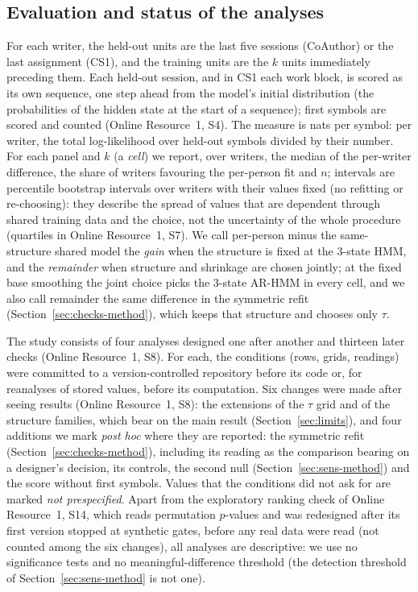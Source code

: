 \documentclass[pdflatex,sn-basic]{sn-jnl}
\newcommand{\Sref}[1]{Online Resource~1, S#1}
\newcommand{\hmmthree}{\mbox{3-state} HMM}
\newcommand{\arthree}{\mbox{3-state} \mbox{AR-HMM}}
\begin{document}
\subsection{Evaluation and status of the analyses}\label{sec:eval}
For each writer, the held-out units are the last five sessions (CoAuthor) or the last assignment (CS1), and the training units are the $k$ units immediately preceding them. Each held-out session, and in CS1 each work block, is scored as its own sequence, one step ahead from the model's initial distribution (the probabilities of the hidden state at the start of a sequence); first symbols are scored and counted (\Sref{4}). The measure is nats per symbol: per writer, the total log-likelihood over held-out symbols divided by their number. For each panel and $k$ (a \emph{cell}) we report, over writers, the median of the per-writer difference, the share of writers favouring the per-person fit and $n$; intervals are percentile bootstrap intervals over writers with their values fixed (no refitting or re-choosing): they describe the spread of values that are dependent through shared training data and the choice, not the uncertainty of the whole procedure (quartiles in \Sref{7}). We call per-person minus the same-structure shared model the \emph{gain} when the structure is fixed at the \hmmthree{}, and the \emph{remainder} when structure and shrinkage are chosen jointly; at the fixed base smoothing the joint choice picks the \arthree{} in every cell, and we also call remainder the same difference in the symmetric refit (Section~\ref{sec:checks-method}), which keeps that structure and chooses only $\tau$.

The study consists of four analyses designed one after another and thirteen later checks (\Sref{8}). For each, the conditions (rows, grids, readings) were committed to a version-controlled repository before its code or, for reanalyses of stored values, before its computation. Six changes were made after seeing results (\Sref{8}): the extensions of the $\tau$ grid and of the structure families, which bear on the main result (Section~\ref{sec:limits}), and four additions we mark \emph{post hoc} where they are reported: the symmetric refit (Section~\ref{sec:checks-method}), including its reading as the comparison bearing on a designer's decision, its controls, the second null (Section~\ref{sec:sens-method}) and the score without first symbols. Values that the conditions did not ask for are marked \emph{not prespecified}. Apart from the exploratory ranking check of \Sref{14}, which reads permutation $p$-values and was redesigned after its first version stopped at synthetic gates, before any real data were read (not counted among the six changes), all analyses are descriptive: we use no significance tests and no meaningful-difference threshold (the detection threshold of Section~\ref{sec:sens-method} is not one).
\end{document}
